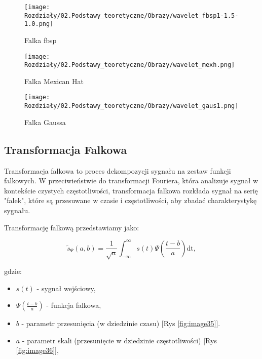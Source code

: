 \begin{figure}[ht]
    \centering
    \begin{minipage}[t]{0.3\linewidth}
        \texttt{[image: Rozdziały/02.Podstawy\_teoretyczne/Obrazy/wavelet\_fbsp1-1.5-1.0.png]}
        \caption{Falka fbsp}
        \label{fig:image31}
    \end{minipage}
    \hspace{0.5cm}
    \begin{minipage}[t]{0.3\linewidth}
        \texttt{[image: Rozdziały/02.Podstawy\_teoretyczne/Obrazy/wavelet\_mexh.png]}
        \caption{Falka Mexican Hat}
        \label{fig:image32}
    \end{minipage}
    \hspace{0.5cm}
    \begin{minipage}[t]{0.3\linewidth}
        \texttt{[image: Rozdziały/02.Podstawy\_teoretyczne/Obrazy/wavelet\_gaus1.png]}
        \caption{Falka Gaussa}
        \label{fig:image33}
    \end{minipage}
\end{figure}


\subsection*{Transformacja Falkowa}

Transformacja falkowa to proces dekompozycji sygnału na zestaw funkcji falkowych. W przeciwieństwie do transformacji Fouriera, która analizuje sygnał w kontekście czystych częstotliwości, transformacja falkowa rozkłada sygnał na serię "falek", które są przesuwane w czasie i częstotliwości, aby zbadać charakterystykę sygnału.


Transformację falkową przedstawiamy jako:

\begin{equation}
    \tilde{s}_{\Psi}(a, b)=\frac{1}{\sqrt{a}} \int_{-\infty}^{\infty} s(t) \Psi\left(\frac{t-b}{a}\right) \mathrm{dt},
\end{equation}

gdzie:
\begin{itemize}
    \item $s(t)$ - sygnał wejściowy,
    \item $\Psi\left(\frac{t-b}{a}\right)$ - funkcja falkowa,
    \item $b$ - parametr przesunięcia (w dziedzinie czasu) [Rys \ref{fig:image35}].
    \item $a$ - parametr skali (przesunięcie w dziedzinie częstotliwości) [Rys \ref{fig:image36}],
\end{itemize}


